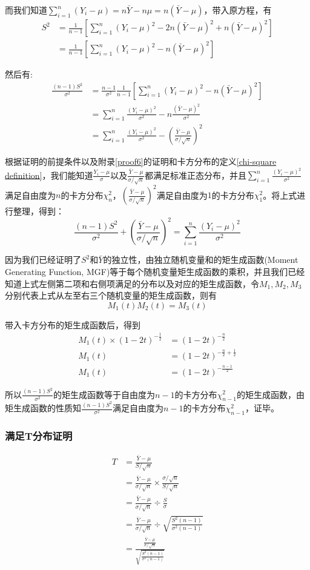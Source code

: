 \documentclass[UTF8]{ctexbook}
\begin{document}
而我们知道$\sum_{i=1}^n(Y_i-\mu)=n\bar Y-n\mu=n(\bar Y-\mu)$，带入原方程，有
\begin{align*}
	S^2&=\frac{1}{n-1}\left[\sum_{i=1}^n(Y_i-\mu)^2-2n(\bar Y-\mu)^2+n(\bar Y-\mu)^2\right]\\
	&=\frac{1}{n-1}\left[\sum_{i=1}^n(Y_i-\mu)^2-n(\bar Y-\mu)^2\right]
\end{align*}

然后有:
\begin{align*}
	\frac{(n-1)S^2}{\sigma^2}&=\frac{n-1}{\sigma^2}\frac{1}{n-1}\left[\sum_{i=1}^n(Y_i-\mu)^2-n(\bar Y-\mu)^2\right]\\
	&=\sum_{i=1}^n\frac{(Y_i-\mu)^2}{\sigma^2}-n\frac{(\bar Y-\mu)^2}{\sigma^2}\\
	&=\sum_{i=1}^n\frac{(Y_i-\mu)^2}{\sigma^2}-\left(\frac{\bar Y-\mu}{\sigma/\sqrt n}\right)^2
\end{align*}

根据证明的前提条件以及附录\ref{proof6}的证明和卡方分布的定义\ref{chi-square definition}，我们能知道$\frac{Y_i-\mu}{\sigma}$以及$\frac{\bar Y-\mu}{\sigma/\sqrt n}$都满足标准正态分布，并且$\sum_{i=1}^n\frac{(Y_i-\mu)^2}{\sigma^2}$满足自由度为$n$的卡方分布$\chi^2_{n}$，$\left(\frac{\bar Y-\mu}{\sigma/\sqrt n}\right)^2$满足自由度为$1$的卡方分布$\chi^2_1$。将上式进行整理，得到：
\[
	\frac{(n-1)S^2}{\sigma^2}+\left(\frac{\bar Y-\mu}{\sigma/\sqrt n}\right)^2=\sum_{i=1}^n\frac{(Y_i-\mu)^2}{\sigma^2}
\]

因为我们已经证明了$S^2$和$\bar Y$的独立性，由独立随机变量和的矩生成函数(Moment Generating Function, MGF)等于每个随机变量矩生成函数的乘积，并且我们已经知道上式左侧第二项和右侧项满足的分布以及对应的矩生成函数，令$M_1,M_2,M_3$分别代表上式从左至右三个随机变量的矩生成函数，则有
\[
	M_1(t)M_2(t)=M_3(t)
\]

带入卡方分布的矩生成函数后，得到
\begin{align*}
	M_1(t)\times(1-2t)^{-\frac{1}{2}}&=(1-2t)^{-\frac{n}{2}}\\
	M_1(t)&=(1-2t)^{-\frac{n}{2}+\frac{1}{2}}\\
	M_1(t)&=(1-2t)^{-\frac{n-1}{2}}
\end{align*}

所以$\frac{(n-1)S^2}{\sigma^2}$的矩生成函数等于自由度为$n-1$的卡方分布$\chi_{n-1}^2$的矩生成函数，由矩生成函数的性质知$\frac{(n-1)S^2}{\sigma^2}$满足自由度为$n-1$的卡方分布$\chi_{n-1}^2$，证毕。

\subsubsection{满足T分布证明}
\label{proof12}
\begin{align*}
	T&=\frac{\bar Y-\mu}{S/\sqrt{n}}\\
	&=\frac{\bar Y-\mu}{\sigma/\sqrt{n}}\times\frac{\sigma/\sqrt{n}}{S/\sqrt{n}}\\
	&=\frac{\bar Y-\mu}{\sigma/\sqrt{n}}\div\frac{S}{\sigma}\\
	&=\frac{\bar Y-\mu}{\sigma/\sqrt{n}}\div\sqrt{\frac{S^2(n-1)}{\sigma^2(n-1)}}\\
	&=\frac{\frac{\bar Y-\mu}{\sigma/\sqrt{n}}}{\sqrt{\frac{S^2(n-1)}{\sigma^2(n-1)}}}
\end{align*}
\end{document}
